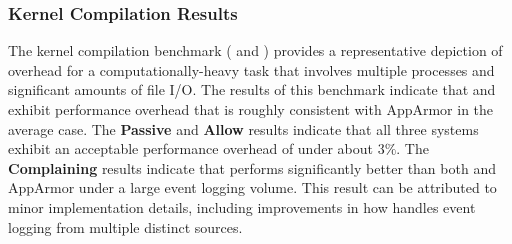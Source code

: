\subsubsection{Kernel Compilation Results}

The kernel compilation benchmark ( and
) provides a representative depiction of overhead for
a computationally-heavy task that involves multiple processes and significant amounts of
file I/O. The results of this benchmark indicate that \bpfbox{} and \bpfcontain{} exhibit
performance overhead that is roughly consistent with AppArmor in the average case. The
\textbf{Passive} and \textbf{Allow} results indicate that all three systems exhibit an
acceptable performance overhead of under about $3\%$. The \textbf{Complaining} results
indicate that \bpfcontain{} performs significantly better than both \bpfbox{} and AppArmor
under a large event logging volume. This result can be attributed to minor implementation
details, including improvements in how \bpfcontain{} handles event logging from multiple
distinct sources.





